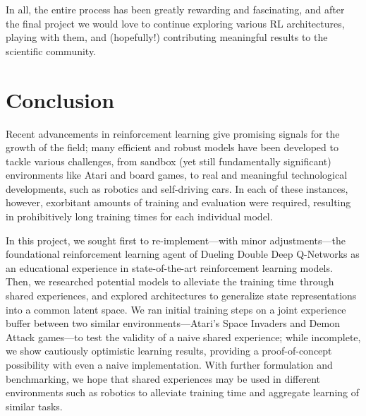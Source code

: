 \documentclass{article} %
\begin{document}
In all, the entire process has been greatly rewarding and fascinating, and after the final project
we would love to continue exploring various RL architectures, playing with them, and (hopefully!)
contributing meaningful results to the scientific community.


\section{Conclusion}

Recent advancements in reinforcement learning give promising signals for the growth of the field;
many efficient and robust models have been developed to tackle various challenges, from sandbox (yet
still fundamentally significant) environments like Atari and board games, to real and meaningful
technological developments, such as robotics and self-driving cars. In each of these instances,
however, exorbitant amounts of training and evaluation were required, resulting in prohibitively
long training times for each individual model.

In this project, we sought first to re-implement---with minor adjustments---the foundational
reinforcement learning agent of Dueling Double Deep Q-Networks as an educational experience in
state-of-the-art reinforcement learning models. Then, we researched potential models to alleviate
the training time through shared experiences, and explored architectures to generalize state
representations into a common latent space. We ran initial training steps on a joint experience
buffer between two similar environments---Atari's Space Invaders and Demon Attack games---to test
the validity of a naive shared experience; while incomplete, we show cautiously optimistic learning
results, providing a proof-of-concept possibility with even a naive implementation. With further
formulation and benchmarking, we hope that shared experiences may be used in different environments
such as robotics to alleviate training time and aggregate learning of similar tasks.
\end{document}
